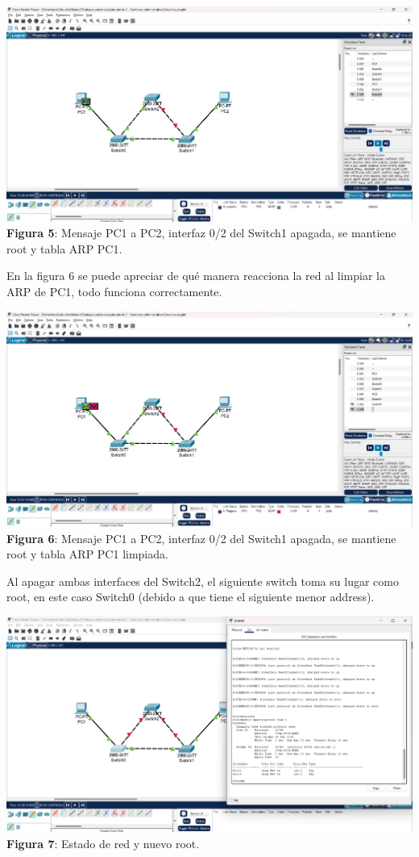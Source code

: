 \documentclass{article}
\begin{document}
    \begin{center}
        \includegraphics[width=0.875\linewidth]{img_06} 
        \linebreak
        \small {\bfseries Figura 5}: Mensaje PC1 a PC2, interfaz 0/2 del Switch1 apagada, se mantiene root y tabla ARP PC1.
    \end{center}
    
    En la figura 6 se puede apreciar de qué manera reacciona la red al limpiar la ARP de PC1, todo funciona correctamente.

    \begin{center}
        \includegraphics[width=0.875\linewidth]{img_07} 
        \linebreak
        \small {\bfseries Figura 6}: Mensaje PC1 a PC2, interfaz 0/2 del Switch1 apagada, se mantiene root y tabla ARP PC1 limpiada.
    \end{center}

    \pagebreak

    Al apagar ambas interfaces del Switch2, el siguiente switch toma su lugar como root, en este caso Switch0 (debido a que tiene el siguiente menor address).

    \begin{center}
        \includegraphics[width=0.875\linewidth]{img_08} 
        \linebreak
        \small {\bfseries Figura 7}: Estado de red y nuevo root.
    \end{center}
\end{document}
